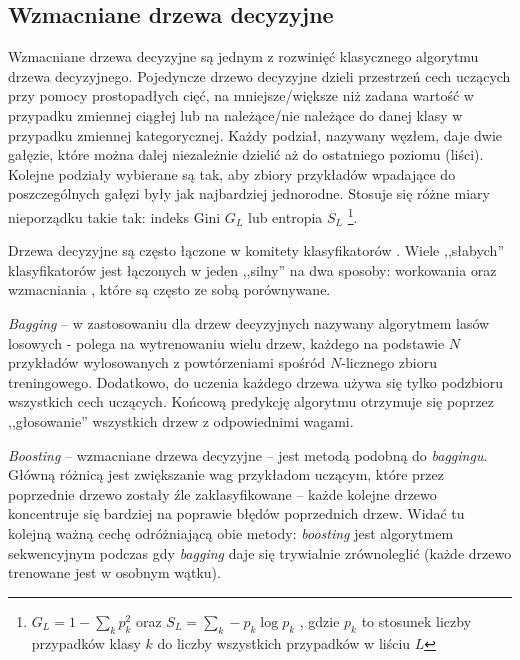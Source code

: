 \subsection{Wzmacniane drzewa decyzyjne}
\label{subsec:drzewa}

Wzmacniane drzewa decyzyjne są jednym z rozwinięć klasycznego algorytmu drzewa decyzyjnego. 
Pojedyncze drzewo decyzyjne dzieli przestrzeń cech uczących przy pomocy prostopadłych cięć, na mniejsze/większe niż zadana wartość w przypadku zmiennej ciągłej lub na należące/nie należące do danej klasy w przypadku zmiennej kategorycznej. Każdy podział, nazywany węzłem, daje dwie gałęzie, które można dalej niezależnie dzielić aż do ostatniego poziomu (liści). Kolejne podziały wybierane są tak, aby zbiory przykładów wpadające do poszczególnych gałęzi były jak najbardziej jednorodne. Stosuje się różne miary nieporządku takie tak: indeks Gini $G_L$ lub entropia $S_L$ \footnote{$G_L = 1 - \sum\limits_k p_k^2$ oraz $S_L = \sum\limits_k -p_k \log p_k$ , gdzie $p_k$ to stosunek liczby przypadków klasy $k$ do liczby wszystkich przypadków w liściu $L$}.

Drzewa decyzyjne są często łączone w komitety klasyfikatorów . Wiele ,,słabych'' klasyfikatorów jest łączonych w jeden ,,silny'' na dwa sposoby: workowania  \cite{breiman1996bagging} oraz wzmacniania  \cite{freund1997decision}, które są często ze sobą porównywane.

\textit{Bagging} -- w zastosowaniu dla drzew decyzyjnych nazywany algorytmem lasów losowych  - polega na wytrenowaniu wielu drzew, każdego na podstawie $N$ przykładów wylosowanych z powtórzeniami spośród $N$-licznego zbioru treningowego. Dodatkowo, do uczenia każdego drzewa używa się tylko podzbioru wszystkich cech uczących. Końcową predykcję algorytmu otrzymuje się poprzez ,,głosowanie'' wszystkich drzew z odpowiednimi wagami.

\textit{Boosting} -- wzmacniane drzewa decyzyjne  -- jest metodą podobną do \textit{baggingu}. Główną różnicą jest zwiększanie wag przykładom uczącym, które przez poprzednie drzewo zostały źle zaklasyfikowane -- każde kolejne drzewo koncentruje się bardziej na poprawie błędów poprzednich drzew. Widać tu kolejną ważną cechę odróżniającą obie metody: \textit{boosting} jest algorytmem sekwencyjnym podczas gdy \textit{bagging} daje się trywialnie zrównoleglić (każde drzewo trenowane jest w osobnym wątku).



